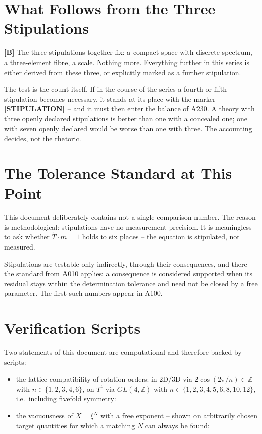 \section{What Follows from the Three Stipulations}

\textbf{[B]} The three stipulations together fix: a compact space with
discrete spectrum, a three-element fibre, a scale. Nothing more. Everything
further in this series is either derived from these three, or explicitly
marked as a further stipulation.

The test is the count itself. If in the course of the series a fourth or
fifth stipulation becomes necessary, it stands at its place with the marker
\textbf{[STIPULATION]} -- and it must then enter the balance of A230. A
theory with three openly declared stipulations is better than one with a
concealed one; one with seven openly declared would be worse than one with
three. The accounting decides, not the rhetoric.

\section{The Tolerance Standard at This Point}

This document deliberately contains not a single comparison number. The
reason is methodological: stipulations have no measurement precision. It is
meaningless to ask whether $\tilde T\cdot m = 1$ holds to six places --
the equation is stipulated, not measured.

Stipulations are testable only indirectly, through their consequences, and
there the standard from A010 applies: a consequence is considered supported
when its residual stays within the determination tolerance and need not be
closed by a free parameter. The first such numbers appear in A100.

\section{Verification Scripts}

Two statements of this document are computational and therefore backed by
scripts:

\begin{itemize}
  \item the lattice compatibility of rotation orders: in 2D/3D via
    $2\cos(2\pi/n)\in\mathbb{Z}$ with $n\in\{1,2,3,4,6\}$, on $T^4$ via
    $GL(4,\mathbb{Z})$ with $n\in\{1,2,3,4,5,6,8,10,12\}$, i.e.\ including
    fivefold symmetry:
  \item the vacuousness of $X=\xi^N$ with a free exponent -- shown on
    arbitrarily chosen target quantities for which a matching $N$ can always
    be found: 
\end{itemize}

